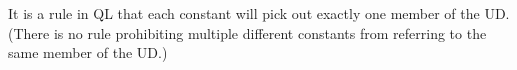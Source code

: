 It is a rule in QL that each constant will pick out exactly one member of the UD. (There is no rule prohibiting multiple different constants from referring to the same member of the UD.)

%
%
%
%
%
%


